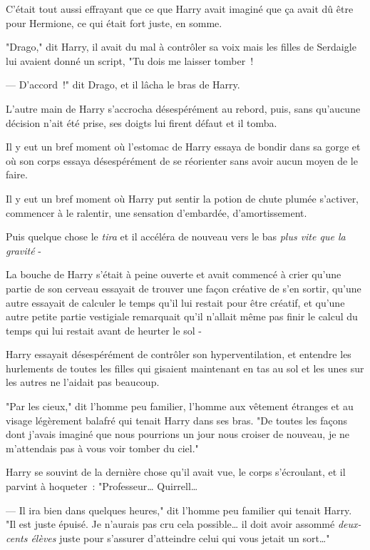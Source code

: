 C'était tout aussi effrayant que ce que Harry avait imaginé que ça avait dû être pour Hermione, ce qui était fort juste, en somme.

"Drago," dit Harry, il avait du mal à contrôler sa voix mais les filles de Serdaigle lui avaient donné un script, "Tu dois me laisser tomber~!

--- D'accord~!" dit Drago, et il lâcha le bras de Harry.

L'autre main de Harry s'accrocha désespérément au rebord, puis, sans qu'aucune décision n'ait été prise, ses doigts lui firent défaut et il tomba.

Il y eut un bref moment où l'estomac de Harry essaya de bondir dans sa gorge et où son corps essaya désespérément de se réorienter sans avoir aucun moyen de le faire.

Il y eut un bref moment où Harry put sentir la potion de chute plumée s'activer, commencer à le ralentir, une sensation d'embardée, d'amortissement.

Puis quelque chose le \emph{tira} et il accéléra de nouveau vers le bas \emph{plus vite que la gravité} -

La bouche de Harry s'était à peine ouverte et avait commencé à crier qu'une partie de son cerveau essayait de trouver une façon créative de s'en sortir, qu'une autre essayait de calculer le temps qu'il lui restait pour être créatif, et qu'une autre petite partie vestigiale remarquait qu'il n'allait même pas finir le calcul du temps qui lui restait avant de heurter le sol -

\later

Harry essayait désespérément de contrôler son hyperventilation, et entendre les hurlements de toutes les filles qui gisaient maintenant en tas au sol et les unes sur les autres ne l'aidait pas beaucoup.

"Par les cieux," dit l'homme peu familier, l'homme aux vêtement étranges et au visage légèrement balafré qui tenait Harry dans ses bras. "De toutes les façons dont j'avais imaginé que nous pourrions un jour nous croiser de nouveau, je ne m'attendais pas à vous voir tomber du ciel."

Harry se souvint de la dernière chose qu'il avait vue, le corps s'écroulant, et il parvint à hoqueter~: "Professeur… Quirrell…

--- Il ira bien dans quelques heures," dit l'homme peu familier qui tenait Harry. "Il est juste épuisé. Je n'aurais pas cru cela possible… il doit avoir assommé \emph{deux-cents élèves} juste pour s'assurer d'atteindre celui qui vous jetait un sort…"

